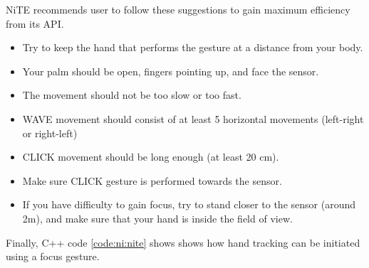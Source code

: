 NiTE recommends user to follow these suggestions to gain maximum efficiency from its API. 
\begin{itemize}
	\item Try to keep the hand that performs the gesture at a distance from your body. 
	\item Your palm should be open, fingers pointing up, and face the sensor. 
	\item The movement should not be too slow or too fast. 
	\item WAVE movement should consist of at least 5 horizontal movements (left-right or right-left) 
	\item CLICK movement should be long enough (at least 20 cm). 
	\item Make sure CLICK gesture is performed towards the sensor. 
	\item If you have difficulty to gain focus, try to stand closer to the sensor (around 2m), and make sure that your hand is inside the field of view. 
\end{itemize}

Finally, C++ code \ref{code:ni:nite} shows shows how hand tracking can be initiated using a focus gesture. 

 \label{code:ni:nite}